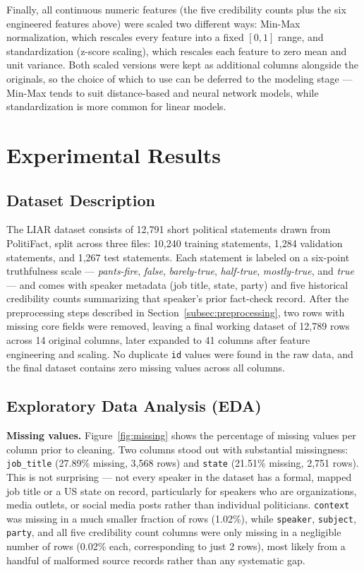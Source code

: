 \documentclass[a4paper,fleqn]{cas-sc}
\begin{document}
Finally, all continuous numeric features (the five credibility counts plus the six engineered features above) were scaled two different ways: Min-Max normalization, which rescales every feature into a fixed $[0,1]$ range, and standardization (z-score scaling), which rescales each feature to zero mean and unit variance. Both scaled versions were kept as additional columns alongside the originals, so the choice of which to use can be deferred to the modeling stage — Min-Max tends to suit distance-based and neural network models, while standardization is more common for linear models.

\section{Experimental Results}\label{sec:results}

\subsection{Dataset Description}\label{subsec:dataset_description}
The LIAR dataset \citep{wang2017liar} consists of 12,791 short political statements drawn from PolitiFact, split across three files: 10,240 training statements, 1,284 validation statements, and 1,267 test statements. Each statement is labeled on a six-point truthfulness scale — \textit{pants-fire}, \textit{false}, \textit{barely-true}, \textit{half-true}, \textit{mostly-true}, and \textit{true} — and comes with speaker metadata (job title, state, party) and five historical credibility counts summarizing that speaker's prior fact-check record. After the preprocessing steps described in Section~\ref{subsec:preprocessing}, two rows with missing core fields were removed, leaving a final working dataset of 12,789 rows across 14 original columns, later expanded to 41 columns after feature engineering and scaling. No duplicate \texttt{id} values were found in the raw data, and the final dataset contains zero missing values across all columns.

\subsection{Exploratory Data Analysis (EDA)}\label{subsec:eda}

\textbf{Missing values.} Figure~\ref{fig:missing} shows the percentage of missing values per column prior to cleaning. Two columns stood out with substantial missingness: \texttt{job\_title} (27.89\% missing, 3,568 rows) and \texttt{state} (21.51\% missing, 2,751 rows). This is not surprising — not every speaker in the dataset has a formal, mapped job title or a US state on record, particularly for speakers who are organizations, media outlets, or social media posts rather than individual politicians. \texttt{context} was missing in a much smaller fraction of rows (1.02\%), while \texttt{speaker}, \texttt{subject}, \texttt{party}, and all five credibility count columns were only missing in a negligible number of rows (0.02\% each, corresponding to just 2 rows), most likely from a handful of malformed source records rather than any systematic gap.
\end{document}

